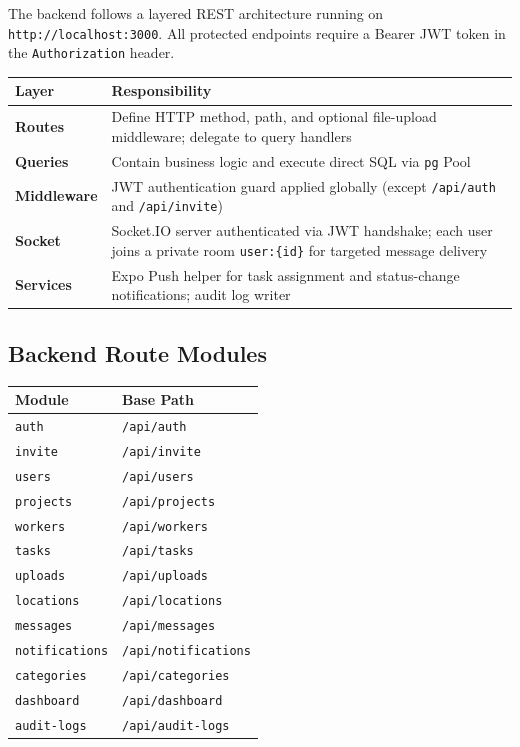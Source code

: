 \documentclass[12pt,a4paper]{article}
\begin{document}
The backend follows a layered REST architecture running on \texttt{http://localhost:3000}. All protected endpoints require a Bearer JWT token in the \texttt{Authorization} header.

\begin{tabular}{lp{}}
\toprule
\textbf{Layer} & \textbf{Responsibility} \\
\midrule
\textbf{Routes} & Define HTTP method, path, and optional file-upload middleware; delegate to query handlers \\
\textbf{Queries} & Contain business logic and execute direct SQL via \texttt{pg} Pool \\
\textbf{Middleware} & JWT authentication guard applied globally (except \texttt{/api/auth} and \texttt{/api/invite}) \\
\textbf{Socket} & Socket.IO server authenticated via JWT handshake; each user joins a private room \texttt{user:\{id\}} for targeted message delivery \\
\textbf{Services} & Expo Push helper for task assignment and status-change notifications; audit log writer \\
\bottomrule
\end{tabular}

\subsection{Backend Route Modules}

\begin{tabular}{ll}
\toprule
\textbf{Module} & \textbf{Base Path} \\
\midrule
\texttt{auth}          & \texttt{/api/auth} \\
\texttt{invite}        & \texttt{/api/invite} \\
\texttt{users}         & \texttt{/api/users} \\
\texttt{projects}      & \texttt{/api/projects} \\
\texttt{workers}       & \texttt{/api/workers} \\
\texttt{tasks}         & \texttt{/api/tasks} \\
\texttt{uploads}       & \texttt{/api/uploads} \\
\texttt{locations}     & \texttt{/api/locations} \\
\texttt{messages}      & \texttt{/api/messages} \\
\texttt{notifications} & \texttt{/api/notifications} \\
\texttt{categories}    & \texttt{/api/categories} \\
\texttt{dashboard}     & \texttt{/api/dashboard} \\
\texttt{audit-logs}    & \texttt{/api/audit-logs} \\
\bottomrule
\end{tabular}
\end{document}
